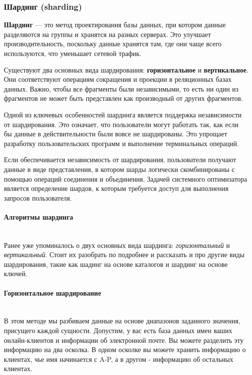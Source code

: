 \subsubsection{Шардинг (sharding)}

\textbf{Шардинг} — это метод проектирования базы данных, при котором данные разделяются на группы и хранятся на разных серверах. Это улучшает производительность, поскольку данные хранятся там, где они чаще всего используются, что уменьшает сетевой трафик.

Существуют два основных вида шардирования: \textbf{горизонтальное} и \textbf{вертикальное}. Они соответствуют операциям сокращения и проекции в реляционных базах данных. Важно, чтобы все фрагменты были независимыми, то есть ни один из фрагментов не может быть представлен как производный от других фрагментов.

Одной из ключевых особенностей шардинга является поддержка независимости от шардирования. Это означает, что пользователи могут работать так, как если бы данные в действительности были вовсе не шардированы. Это упрощает разработку пользовательских программ и выполнение терминальных операций.

Если обеспечивается независимость от шардирования, пользователи получают данные в виде представления, в котором шарды логически скомбинированы с помощью операций соединения и объединения. Задачей системного оптимизатора является определение шардов, к которым требуется доступ для выполнения запросов пользователя.
\autocite{IntroBD2014}

\paragraph{Алгоритмы шардинга} ~\\
Ранее уже упоминалось о двух основных вида шардинга: \textit{горизонтальный} и \textit{вертикальный}. Стоит их разобрать по подробнее и
рассказать и про другие виды шардирования, такие как шадинг на основе каталогов и шардинг на основе ключей.

\paragraph{Горизонтальное шардирование} ~\\
В этом методе мы разбиваем данные на основе диапазонов заданного значения, присущего каждой сущности. Допустим, у вас
есть база данных имен ваших онлайн-клиентов и информации об электронной почте. Вы можете разделить эту информацию на
два осколка. В одном осколке вы можете хранить информацию о клиентах, чье имя начинается с A-P, а в другом - информацию
об остальных клиентах.

